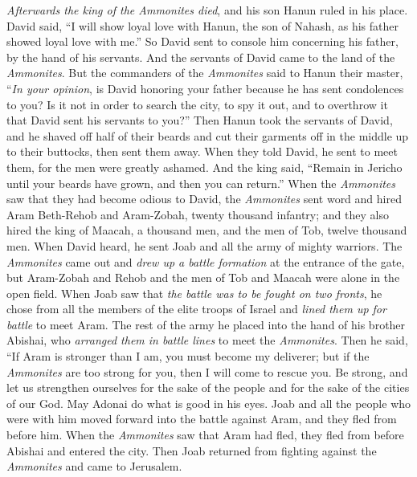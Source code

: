 \begin{biblechapter} %
 \textit{Afterwards the king of the Ammonites died}, and his son Hanun ruled in his place.
\verse David said, “I will show loyal love with Hanun, the son of Nahash, as his father showed loyal love with me.” So David sent to console him concerning his father, by the hand of his servants. And the servants of David came to the land of the \textit{Ammonites}.
\verse But the commanders of the \textit{Ammonites} said to Hanun their master, “\textit{In your opinion}, is David honoring your father because he has sent condolences to you? Is it not in order to search the city, to spy it out, and to overthrow it that David sent his servants to you?”
\verse Then Hanun took the servants of David, and he shaved off half of their beards and cut their garments off in the middle up to their buttocks, then sent them away.
\verse When they told David, he sent to meet them, for the men were greatly ashamed. And the king said, “Remain in Jericho until your beards have grown, and then you can return.”
 When the \textit{Ammonites} saw that they had become odious to David, the \textit{Ammonites} sent word and hired Aram Beth-Rehob and Aram-Zobah, twenty thousand infantry; and they also hired the king of Maacah, a thousand men, and the men of Tob, twelve thousand men.
\verse When David heard, he sent Joab and all the army of mighty warriors.
\verse The \textit{Ammonites} came out and \textit{drew up a battle formation} at the entrance of the gate, but Aram-Zobah and Rehob and the men of Tob and Maacah were alone in the open field.
\verse When Joab saw that \textit{the battle was to be fought on two fronts}, he chose from all the members of the elite troops of Israel and \textit{lined them up for battle} to meet Aram.
\verse The rest of the army he placed into the hand of his brother Abishai, who \textit{arranged them in battle lines} to meet the \textit{Ammonites}.
\verse Then he said, “If Aram is stronger than I am, you must become my deliverer; but if the \textit{Ammonites} are too strong for you, then I will come to rescue you.
\verse Be strong, and let us strengthen ourselves for the sake of the people and for the sake of the cities of our God. May Adonai do what is good in his eyes.
\verse Joab and all the people who were with him moved forward into the battle against Aram, and they fled from before him.
\verse When the \textit{Ammonites} saw that Aram had fled, they fled from before Abishai and entered the city. Then Joab returned from fighting against the \textit{Ammonites} and came to Jerusalem.

\end{biblechapter}
